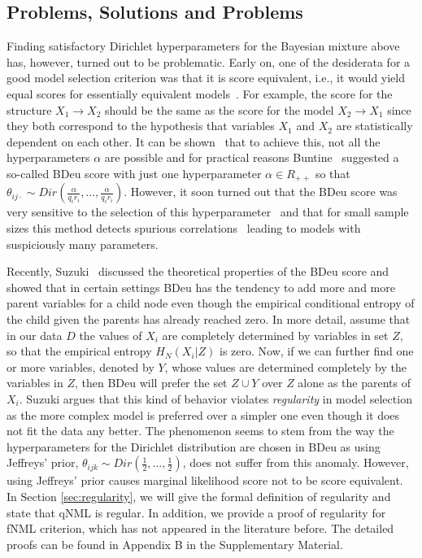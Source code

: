 \subsection {Problems, Solutions and Problems}

Finding satisfactory Dirichlet hyperparameters for the Bayesian
mixture above has, however, turned out to be problematic. Early on,
one of the desiderata for a good model selection criterion was that it
is score equivalent, i.e., it would yield equal scores for
essentially equivalent models~\cite{Verm90}.  For example, the score
for the structure $X_1\rightarrow X_2$ should be the same as the score
for the model $X_2 \rightarrow X_1$ since they both correspond to the
hypothesis that variables $X_1$ and $X_2$ are statistically dependent
on each other.  It can be shown~\cite{Heck95} that to achieve this,
not all the hyperparameters $\alpha$ are possible and for practical
reasons Buntine~\cite{Bunt91} suggested a so-called BDeu score with
just one hyperparameter $\alpha\in R_{++}$ so that
$\theta_{ij\cdot}\sim Dir(\frac{\alpha}{q_i
  r_i},\ldots,\frac{\alpha}{q_i r_i})$.  However, it soon turned out
that the BDeu score was very sensitive to the selection of this
hyperparameter~\cite{cosco.uai07} and that for small sample sizes this
method detects spurious correlations~\cite{Steck08} leading to models
with suspiciously many parameters.

Recently, Suzuki~\cite{Suzuki2017} discussed the theoretical
properties of the BDeu score and showed that in certain settings BDeu
has the tendency to add more and more parent variables for a child node
even though the empirical conditional entropy of the child given the
parents has already reached zero. In more detail, assume that in our
data $D$ the values of $X_i$ are completely determined by variables
in set $Z$, so that the empirical entropy $H_N(X_i | Z)$ is zero. Now, if we can further
find one or more variables, denoted by $Y$, whose values are
determined completely by the variables in $Z$, then BDeu will prefer
the set $Z\cup Y$ over $Z$ alone as the parents of $X_i$. Suzuki
argues that this kind of behavior violates \textit{regularity} in model
selection as the more complex model is preferred over a simpler one
even though it does not fit the data any better. The phenomenon seems
to stem from the way the hyperparameters for the Dirichlet
distribution are chosen in BDeu as using Jeffreys' prior,
$\theta_{ijk}\sim Dir(\frac{1}{2},\ldots,\frac{1}{2})$, does not suffer
from this anomaly. However, using Jeffreys' prior causes marginal
likelihood score not to be score equivalent. In Section \ref{sec:regularity}, we will give the formal definition of regularity and state that qNML is regular. In addition, we provide a proof of regularity for fNML criterion, which has not appeared in the literature before. The detailed proofs can be found in Appendix B in the Supplementary Material.     

